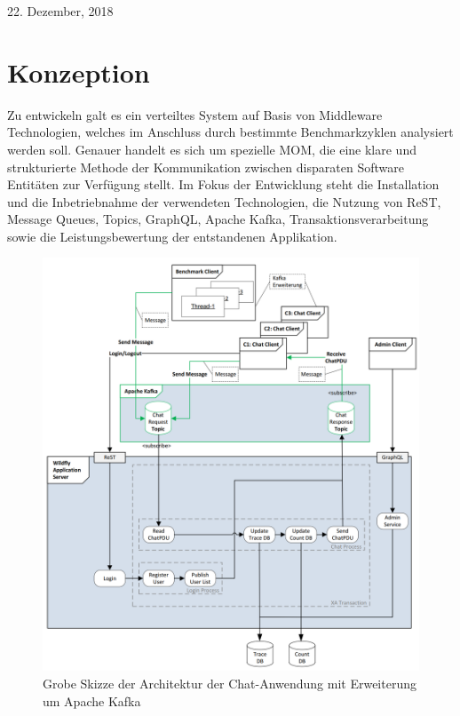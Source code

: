 \documentclass[10pt,journal,compsoc]{IEEEtran}
\begin{document}
\hfill 22. Dezember, 2018

\section{Konzeption}
Zu entwickeln galt es ein verteiltes System auf Basis von Middleware Technologien, welches im Anschluss durch bestimmte Benchmarkzyklen analysiert werden soll. Genauer handelt es sich um spezielle \ac{MOM}, die eine klare und strukturierte Methode der Kommunikation zwischen disparaten Software Entitäten zur Verfügung stellt. \cite{MOM:Introduction} Im Fokus der Entwicklung steht die Installation und die Inbetriebnahme der verwendeten Technologien, die Nutzung von \ac{ReST}, Message Queues, Topics, GraphQL, Apache Kafka, Transaktionsverarbeitung sowie die Leistungsbewertung der entstandenen Applikation. 


\begin{figure}[h]
	\centering
	\includegraphics[scale=0.4]{Bilder/Grobe_Architektur.png}
	\caption{Grobe Skizze der Architektur der Chat-Anwendung mit Erweiterung um Apache Kafka}
	\label{fig:Architektur}
\end{figure}
\end{document}
